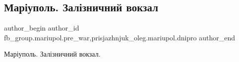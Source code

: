  
 
 
 
 

\subsection{Маріуполь. Залізничний вокзал}
\label{sec:11_02_2023.fb.fb_group.mariupol.pre_war.10.mar_upol__zal_znichn}
 
\ifcmt
 author_begin
   author_id fb_group.mariupol.pre_war,prisjazhnjuk_oleg.mariupol.dnipro
 author_end
\fi

Маріуполь. Залізничний вокзал.

